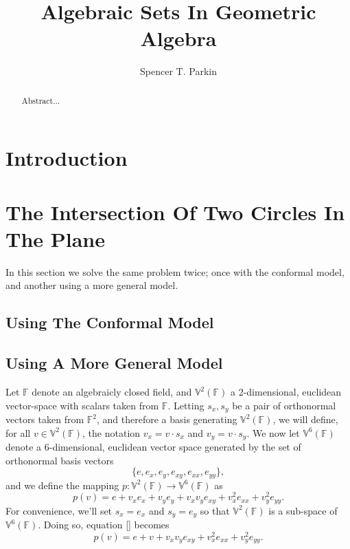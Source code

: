\documentclass{birkjour}
\theoremstyle{definition}
\theoremstyle{remark}
\numberwithin{equation}{section}
\newcommand{\F}{\mathbb{F}}
\newcommand{\V}{\mathbb{V}}
\begin{document}
\title{Algebraic Sets In Geometric Algebra}

\author{Spencer T. Parkin}



\begin{abstract}
Abstract...
\end{abstract}


\maketitle

\section{Introduction}


\section{The Intersection Of Two Circles In The Plane}

In this section we solve the same problem twice; once with the conformal model, and another using
a more general model.

\subsection{Using The Conformal Model}

\subsection{Using A More General Model}

Let $\F$ denote an algebraicly closed field, and $\V^2(\F)$ a 2-dimensional, euclidean vector-space with
scalars taken from $\F$.  Letting $s_x,s_y$ be a pair of orthonormal vectors
taken from $\F^{2}$, and therefore a basis generating $\V^2(\F)$, we will define, for all $v\in\V^2(\F)$, the notation
$v_x=v\cdot s_x$ and $v_y=v\cdot s_y$.  We now let $\V^6(\F)$ denote a 6-dimensional, euclidean vector space
generated by the set of orthonormal basis vectors
\begin{equation*}
\{e,e_x,e_y,e_{xy},e_{xx},e_{yy}\},
\end{equation*}
and we define the mapping $p:\V^2(\F)\to\V^6(\F)$ as
\begin{equation*}
p(v) = e + v_xe_x + v_ye_y + v_xv_ye_{xy} + v_x^2e_{xx} + v_y^2e_{yy}.
\end{equation*}
For convenience, we'll set $s_x=e_x$ and $s_y=e_y$ so that $\V^2(\F)$ is a sub-space of $\V^6(\F)$.
Doing so, equation \eqref{} becomes
\begin{equation*}
p(v) = e + v + v_xv_ye_{xy} + v_x^2e_{xx} + v_y^2e_{yy}.
\end{equation*}

\begin{thebibliography}{9}

\end{thebibliography}
\end{document}

